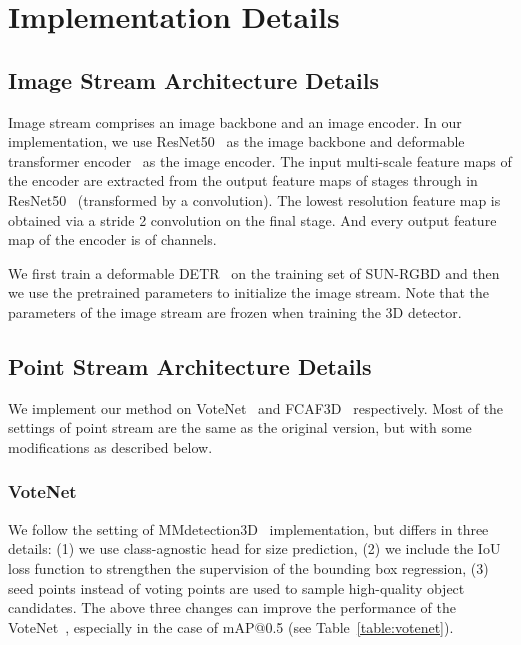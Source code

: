 \documentclass[runningheads]{llncs}
\begin{document}
\clearpage


\appendix
\renewcommand\thesection{\Alph{section}}

\section{Implementation Details}

\subsection{Image Stream Architecture Details}
Image stream comprises an image backbone and an image encoder. In our implementation, we use ResNet50~\cite{he2016deep} as the image backbone and deformable transformer encoder~\cite{zhu2020deformable} as the image encoder. The input multi-scale feature maps of the encoder  are extracted from the output feature maps of stages  through  in ResNet50~\cite{he2016deep} (transformed by a  convolution). The lowest resolution feature map  is obtained via a  stride 2 convolution on the final  stage.
And every output feature map of the encoder is of  channels.

We first train a deformable DETR~\cite{zhu2020deformable} on the training set of SUN-RGBD and then we use the pretrained parameters to initialize the image stream. Note that the parameters of the image stream are frozen when training the 3D detector.

\subsection{Point Stream Architecture Details}
We implement our method on VoteNet~\cite{qi2019deep} and FCAF3D~\cite{rukhovich2021fcaf3d} respectively. Most of the settings of point stream are the same as the original version, but with some modifications as described below.

\subsubsection{VoteNet}
We follow the setting of MMdetection3D~\cite{mmdet3d2020} implementation, but differs in three details:
(1) we use class-agnostic head for size prediction, (2) we include the IoU loss function to strengthen the supervision of the bounding box regression, (3) seed points instead of voting points are used to sample high-quality object candidates.
The above three changes can improve the performance of the VoteNet~\cite{qi2019deep}, especially in the case of mAP@0.5 (see Table~\ref{table:votenet}).
\end{document}
